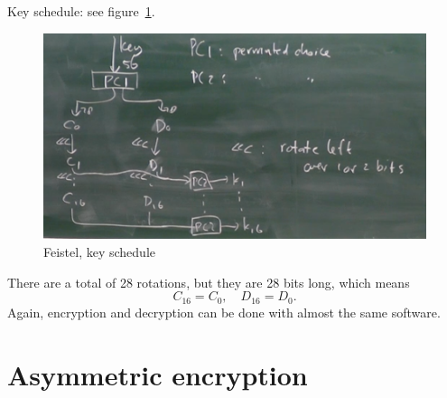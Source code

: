 \documentclass[language=english,number=]{homework}
\begin{document}
    Key schedule: see figure~\ref{feistelkey}.
\begin{figure}
    \centering
    \includegraphics[width=\textwidth]{feistelkey.PNG}
    \caption{Feistel, key schedule}
    \label{feistelkey}
\end{figure}

    There are a total of 28 rotations, but they are 28 bits long, which means
    \[
        C_{16} = C_0, \quad D_{16} = D_0.
    \]
    Again, encryption and decryption can be done with almost the same software.

    \newpage
    \section{Asymmetric encryption}
\end{document}
